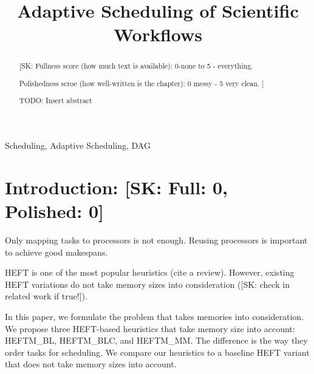 \documentclass[conference]{IEEEtran}
\newcommand{\algo}[1]{\textsc{#1}}
\newcommand{\heftmm}{\algo{HEFTM\_MM}\xspace}
\newcommand{\heftbl}{\algo{HEFTM\_BL}\xspace}
\newcommand{\heftblc}{\algo{HEFTM\_BLC}\xspace}
\newcommand{\skug}[1]{{\color{blue}[SK: #1]}}
\begin{document}
    \title{Adaptive Scheduling of Scientific Workflows\\
    }



    \maketitle

    \begin{abstract}
        \skug{Fullness score (how much text is available): 0-none to 5 - everything.

        Polishedness scroe (how well-written is the chapter): 0 messy - 5 very clean.
        }
        TODO: Insert abstract
    \end{abstract}

    \begin{IEEEkeywords}
        Scheduling, Adaptive Scheduling, DAG
    \end{IEEEkeywords}

    \section{Introduction: \skug{Full: 0, Polished: 0}}

    Only mapping tasks to processors is not enough.
    Reusing processors is important to achieve good makespans.

    HEFT is one of the most popular heuristics (cite a review).
    However, existing HEFT variations do not take memory sizes into consideration (\skug{check in related work if true!}).

    In this paper, we formulate the problem that takes memories into consideration.
    We propose three HEFT-based heuristics that take memory size into account: \heftbl, \heftblc, and \heftmm.
    The difference is the way they order tasks for scheduling.
    We compare our heuristics to a baseline HEFT variant that does not take memory sizes into account.
\end{document}
